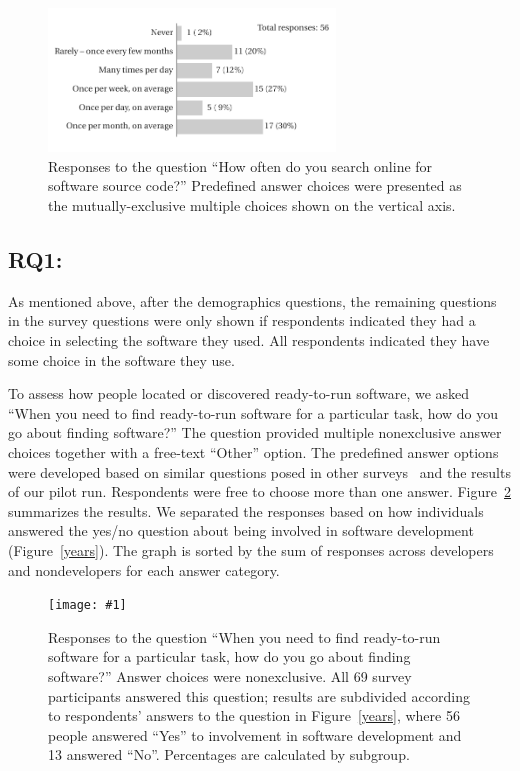 \documentclass[review]{elsarticle}
\newcommand{\totalRespondents}{69\xspace}
\newcommand{\totalDevelopers}{56\xspace}
\newcommand{\includefile}[1]{\texttt{[image: \#1]}}
\begin{document}
\begin{figure}[bht]
  \centering
  \includegraphics[width=3in]{files/plots/bar-graph-how-often-src.pdf}
  \caption{Responses to the question  ``How often do you search online for software source code?''  Predefined answer choices were presented as the mutually-exclusive multiple choices shown on the vertical axis.}
  \label{how-often-search-for-src}
\end{figure}

\clearpage

\subsection{RQ1: \rqonetext}
\label{results-rqone}

As mentioned above, after the demographics questions, the remaining questions in the survey questions were only shown if respondents indicated they had a choice in selecting the software they used.  All respondents indicated they have some choice in the software they use.

To assess how people located or discovered ready-to-run software, we asked ``When you need to find ready-to-run software for a particular task, how do you go about finding software?''  The question provided multiple nonexclusive answer choices together with a free-text ``Other'' option.  The predefined answer options were developed based on similar questions posed in other surveys~\citep{sim_2011, bajrachary_2009, linstead_2009} and the results of our pilot run.  Respondents were free to choose more than one answer.  Figure~\ref{how-find-ready-to-run} summarizes the results.  We separated the responses based on how individuals answered the yes/no question about being involved in software development (Figure~\ref{years}).  The graph is sorted by the sum of responses across developers and nondevelopers for each answer category.

\begin{figure}[bht]
  \centering
  \includefile{files/plots/how-find-ready-to-run-v4.pdf}
  \caption{Responses to the question ``When you need to find ready-to-run software for a particular task, how do you go about finding software?'' Answer choices were nonexclusive.  All \totalRespondents survey participants answered this question; results are subdivided according to respondents' answers to the question in Figure~\ref{years}, where \totalDevelopers people answered ``Yes'' to involvement in software development and 13 answered ``No''.  Percentages are calculated by subgroup.}
  \label{how-find-ready-to-run}
\end{figure}
\end{document}
